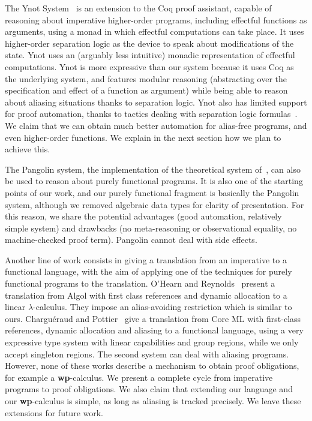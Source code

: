 \documentclass[a4paper]{llncs}
\newcommand{\wpre}{{\bf wp}}
\begin{document}
The Ynot System~\cite{Nanevski08Awkward,chlipalaicfp09} is an extension to the
Coq proof assistant, capable of reasoning about imperative higher-order
programs, including effectful functions as arguments, using a monad in which
effectful computations can take place. It uses higher-order separation logic
as the device to speak about modifications of the state. Ynot uses an
(arguably less intuitive) monadic representation of effectful computations.
Ynot is more expressive than our system because it uses Coq as the underlying
system, and features modular reasoning (abstracting over the specification and
effect of a function as argument) while being able to reason about aliasing
situations thanks to separation logic. Ynot also has limited support for
proof automation, thanks to tactics dealing with separation logic
formulas~\cite{chlipalaicfp09}. We claim that we can obtain much better
automation for alias-free programs, and even higher-order functions. We
explain in the next section how we plan to achieve this.

The Pangolin system, the implementation of the theoretical system
of~\cite{regis-gianas-pottier-08}, can also be used to reason about
purely functional programs. It is also one of the starting points of
our work, and our purely functional fragment is basically the Pangolin
system, although we removed algebraic data types for clarity of
presentation. For this reason, we share the potential advantages (good
automation, relatively simple system) and drawbacks (no
meta-reasoning or observational equality, no machine-checked proof
term). Pangolin cannot deal with side effects.

Another line of work consists in giving a translation from an imperative to a
functional language, with the aim of applying one of the techniques for purely
functional programs to the translation. O'Hearn and
Reynolds~\cite{ohearn-reynolds-00} present a translation from Algol with first
class references and dynamic allocation to a linear $\lambda$-calculus. They
impose an alias-avoiding restriction which is similar to ours. Charguéraud and
Pottier~\cite{chargueraud-pottier-08} give a translation from Core ML with
first-class references, dynamic allocation and aliasing to a functional
language, using a very expressive type system with linear capabilities and
group regions, while we only accept singleton regions. The second system can
deal with aliasing programs. However, none of these works describe a mechanism
to obtain proof obligations, for example a \wpre-calculus.  We present a
complete cycle from imperative programs to proof obligations. We also claim
that extending our language and our \wpre-calculus is simple, as long as
aliasing is tracked precisely.  We leave these extensions for future work.
\end{document}
